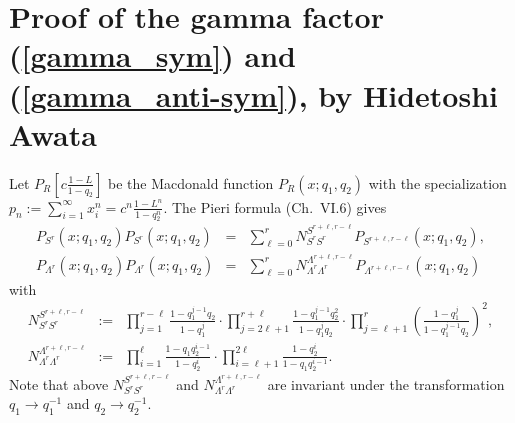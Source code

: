\documentclass[hyper,letterpaper]{JHEP3}
\begin{document}

\newpage


\section{Proof of the gamma factor (\protect\ref{gamma_sym}) and
 (\protect\ref{gamma_anti-sym}), by Hidetoshi Awata}
\label{sec:gamma_proof}
Let $P_R\left[ c \frac{1-L}{1-q_2} \right]$
be the Macdonald function $P_R(x;q_1,q_2)$
with the specialization
$p_n := \sum_{i=1}^\infty x_i^n =  c^n \frac{1-L^n}{1-q_2^{n}}$.
%
%
%
The Pieri formula
\cite{McD}(Ch.\ VI.6) %
gives
\begin{eqnarray}
P_{S^r}(x;q_1,q_2) P_{S^r}(x;q_1,q_2)
&=&
\sum_{\ell=0}^r N_{S^rS^r}^{S^{r+\ell,r-\ell}} P_{S^{r+\ell,r-\ell}} (x;q_1,q_2)
,
\\
P_{\Lambda^r}(x;q_1,q_2) P_{\Lambda^r}(x;q_1,q_2)
&=&
\sum_{\ell=0}^r N_{\Lambda^r\Lambda^r}^{\Lambda^{r+\ell,r-\ell}} P_{\Lambda^{r+\ell,r-\ell}} (x;q_1,q_2)
\end{eqnarray}
with
\begin{eqnarray}
N_{S^rS^r}^{S^{r+\ell,r-\ell}}
&:=&
\prod_{j=1}^{r-\ell}
\frac{ 1-q_1^{j-1} q_2} {1-q_1^j }
\cdot
\prod_{j=2\ell+1}^{r+\ell}
\frac{ 1-q_1^{j-1} q_2^2}{ 1-q_1^j q_2 }
\cdot
\prod_{j=\ell+1}^{r}
\left(
\frac{ 1-q_1^{j}}{1-q_1^{j-1} q_2 }
\right)^2
,
\\
N_{\Lambda^r\Lambda^r}^{\Lambda^{r+\ell,r-\ell}}
&:=&
\prod_{i=1}^{\ell}
\frac{ 1-q_1 q_2^{i-1}}{ 1-q_2^i }
\cdot
\prod_{i=\ell+1}^{2\ell}
\frac{ 1-q_2^{i}}{1-q_1q_2^{i-1} }
.
\end{eqnarray}
Note that above $N_{S^rS^r}^{S^{r+\ell,r-\ell}}$ and $N_{\Lambda^r\Lambda^r}^{\Lambda^{r+\ell,r-\ell}}$ are
invariant under the transformation
$q_1\rightarrow q_1^{-1}$ and $q_2\rightarrow q_2^{-1}$.
\end{document}
